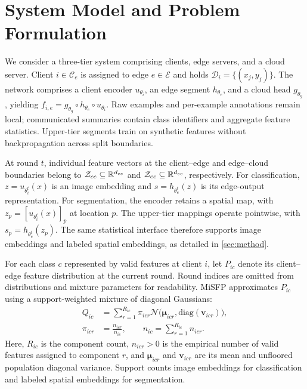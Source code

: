 \section{System Model and Problem Formulation}
\label{sec:problem}

We consider a three-tier system comprising clients, edge servers, and a cloud server. Client $i\in\mathcal C_e$ is assigned to edge $e\in\mathcal E$ and holds $\mathcal D_i=\{(x_j,y_j)\}$. The network comprises a client encoder $u_{\theta_i}$, an edge segment $h_{\theta_e}$, and a cloud head $g_{\theta_g}$, yielding $f_{i,e}=g_{\theta_g}\circ h_{\theta_e}\circ u_{\theta_i}$. Raw examples and per-example annotations remain local; communicated summaries contain class identifiers and aggregate feature statistics. Upper-tier segments train on synthetic features without backpropagation across split boundaries.

At round $t$, individual feature vectors at the client--edge and edge--cloud boundaries belong to $\mathcal Z_{ce}\subseteq\mathbb{R}^{d_{ce}}$ and $\mathcal Z_{ec}\subseteq\mathbb{R}^{d_{ec}}$, respectively. For classification, $z=u_{\theta_i^t}(x)$ is an image embedding and $s=h_{\theta_e^t}(z)$ is its edge-output representation. For segmentation, the encoder retains a spatial map, with $z_p=[u_{\theta_i^t}(x)]_p$ at location $p$. The upper-tier mappings operate pointwise, with $s_p=h_{\theta_e^t}(z_p)$. The same statistical interface therefore supports image embeddings and labeled spatial embeddings, as detailed in \cref{sec:method}.

For each class $c$ represented by valid features at client $i$, let $P_{ic}$ denote its client--edge feature distribution at the current round. Round indices are omitted from distributions and mixture parameters for readability. MiSFP approximates $P_{ic}$ using a support-weighted mixture of diagonal Gaussians:
\begin{equation}
\label{eq:mixture}
\begin{aligned}
Q_{ic}
&=
\sum_{r=1}^{R_{ic}}
\pi_{icr}\mathcal N
\bigl(\bm\mu_{icr},\mathrm{diag}(\bm v_{icr})\bigr),\\
\pi_{icr}
&=
\frac{n_{icr}}{n_{ic}},
\qquad
n_{ic}=\sum_{r=1}^{R_{ic}}n_{icr}.
\end{aligned}
\end{equation}
Here, $R_{ic}$ is the component count, $n_{icr}>0$ is the empirical number of valid features assigned to component $r$, and $\bm\mu_{icr}$ and $\bm v_{icr}$ are its mean and unfloored population diagonal variance. Support counts image embeddings for classification and labeled spatial embeddings for segmentation.


